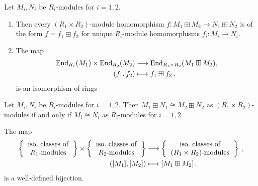 \begin{corollary}
  \label{label: endomorphism ring of boxsum}
  Let $M_i, N_i$ be $R_i$-modules for $i = 1, 2$.
  \begin{enumerate}
    \item
      Then every $(R_1 \times R_2)$-module homomorphism $f \colon M_1 \boxplus M_2 \to N_1 \boxplus N_2$ is of the form $f = f_1 \boxplus f_2$ for unique $R_i$-module homomorphisms $f_i \colon M_i \to N_i$.
    \item
      The map
      \begin{align*}
                  \operatorname{End}_{R_1}(M_1) \times \operatorname{End}_{R_2}(M_2)
        &\longrightarrow  \operatorname{End}_{R_1 \times R_2}(M_1 \boxplus M_2),
        \\
                      (f_1, f_2)
        &\longmapsto  f_1 \boxplus f_2 \,.
      \end{align*}
      is an isomorphism of rings
  \end{enumerate}
\end{corollary}




\begin{corollary}
  Let $M_i, N_i$ be $R_i$-modules for $i = 1, 2$.
  Then $M_1 \boxplus N_1 \cong M_2 \boxplus N_2$ as $(R_1 \times R_2)$-modules if and only if $M_i \cong N_i$ as $R_i$-modules for $i = 1, 2$.
\end{corollary}




\begin{corollary}
  \label{corollary: isomorphism classes of modules over products}
  The map
  \begin{align*}
    \left\{
      \begin{tabular}{c}
        iso.\ classes of  \\
        $R_1$-modules
      \end{tabular}
    \right\}
    \times
    \left\{
      \begin{tabular}{c}
        iso.\ classes of  \\
        $R_2$-modules
      \end{tabular}
    \right\}
    &\longto
    \left\{
      \begin{tabular}{c}
        iso.\ classes of \\
        $(R_1 \times R_2)$-modules
      \end{tabular}
    \right\} \,,
    \\
    ( [M_1], [M_2] )
    &\longmapsto
    [M_1 \boxplus M_2] \,,
  \end{align*}
  is a well-defined bijection.
\end{corollary}


